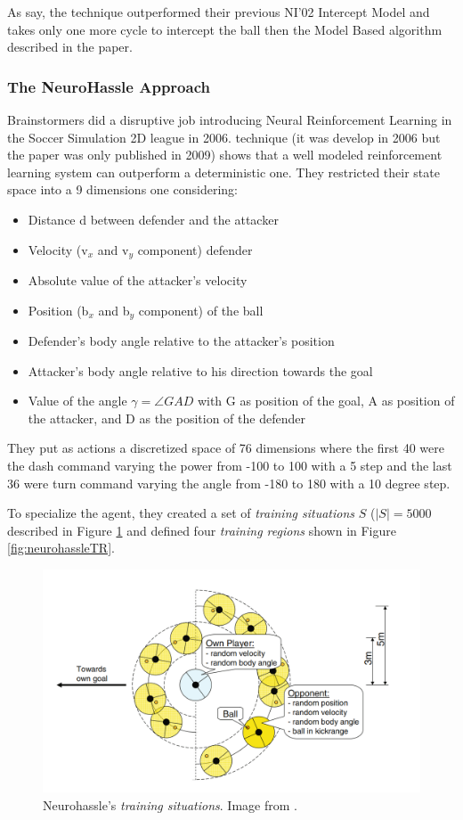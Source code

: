 As \cite{brainstormersIntercept} say, the technique outperformed their previous NI'02 Intercept Model and takes only one more cycle to intercept the ball then the Model Based algorithm described in the paper.

\subsubsection{The NeuroHassle Approach}
Brainstormers did a disruptive job introducing Neural Reinforcement Learning in the Soccer Simulation 2D league in 2006. \cite{neurohassle} technique (it was develop in 2006 but the paper was only published in 2009) shows that a well modeled reinforcement learning system can outperform a deterministic one.
They restricted their state space into a 9 dimensions one considering:
\begin{itemize}
    \item Distance d between defender and the attacker
    \item Velocity (v$_x$ and v$_y$ component) defender
    \item Absolute value of the attacker’s velocity
    \item Position (b$_x$ and b$_y$ component) of the ball
    \item Defender’s body angle relative to the attacker’s position
    \item Attacker’s body angle relative to his direction towards the goal
    \item Value of the angle $\gamma = \angle GAD$ with G as position of the goal, A as position of the attacker, and D as the position of the defender
\end{itemize}
They put as actions a discretized space of 76 dimensions where the first 40 were the dash command  varying the power from -100 to 100 with a 5 step and the last 36 were turn command varying the angle from -180 to 180 with a 10 degree step.

To specialize the agent, they created a set of \textit{training situations} $S$ ($|S|=5000$ described in Figure \ref{fig:neurohassleTS} and defined four \textit{training regions} shown in Figure \ref{fig:neurohassleTR}.

\begin{figure}[H]
    \centering
    \includegraphics[scale=0.25]{images/neurohassleTS.png}
    \caption{Neurohassle's \textit{training situations}. Image from \cite{neurohassle}.}
    \label{fig:neurohassleTS}
\end{figure}

